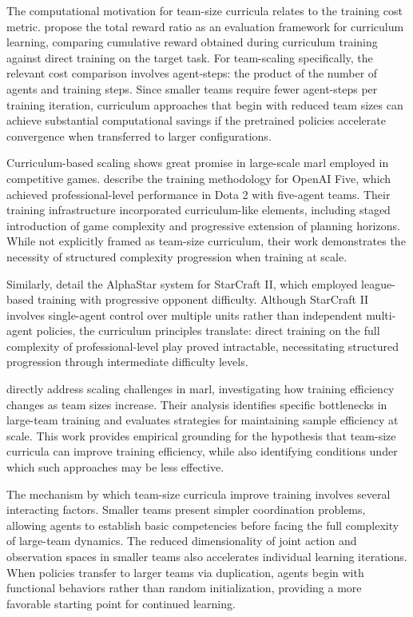 The computational motivation for team-size curricula relates to 
the training cost metric. \cite{narvekar2020} propose the total 
reward ratio as an evaluation framework for curriculum learning, 
comparing cumulative reward obtained during curriculum training 
against direct training on the target task. For team-scaling 
specifically, the relevant cost comparison involves agent-steps: 
the product of the number of agents and training steps. 
Since smaller teams require fewer agent-steps per training iteration, 
curriculum approaches that begin with reduced team sizes can 
achieve substantial computational savings if the pretrained 
policies accelerate convergence when transferred to larger 
configurations.

Curriculum-based scaling shows great promise in 
large-scale \gls{marl} employed in competitive games.
\cite{berner2019} describe the training methodology for OpenAI Five, which 
achieved professional-level performance in Dota 2 with five-agent teams. 
Their training infrastructure incorporated curriculum-like elements, 
including staged introduction of game complexity and progressive 
extension of planning horizons. While not explicitly framed as 
team-size curriculum, their work demonstrates the necessity of 
structured complexity progression when training at scale.

Similarly, \cite{vinyals2019} detail the AlphaStar system for StarCraft II, 
which employed league-based training with progressive opponent difficulty. 
Although StarCraft II involves single-agent control over multiple units 
rather than independent multi-agent policies, the curriculum principles 
translate: direct training on the full complexity of professional-level 
play proved intractable, necessitating structured progression through 
intermediate difficulty levels.

\cite{liu2024a} directly address scaling challenges in \gls{marl}, 
investigating how training efficiency changes as team sizes increase. 
Their analysis identifies specific bottlenecks in large-team training 
and evaluates strategies for maintaining sample efficiency at scale. 
This work provides empirical grounding for the hypothesis that team-size 
curricula can improve training efficiency, while also identifying 
conditions under which such approaches may be less effective.

The mechanism by which team-size curricula improve training 
involves several interacting factors. Smaller teams present 
simpler coordination problems, allowing agents to establish basic 
competencies before facing the full complexity of large-team dynamics. 
The reduced dimensionality of joint action and observation spaces 
in smaller teams also accelerates individual learning iterations. 
When policies transfer to larger teams via duplication, agents 
begin with functional behaviors rather than random initialization, 
providing a more favorable starting point for continued learning.

